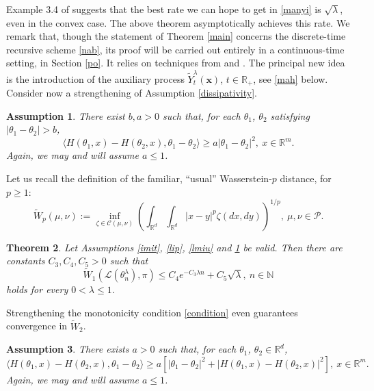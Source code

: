 \documentclass[a4paper,draft]{article}
\newtheorem{theorem}{Theorem}[section]
\newtheorem{assumption}[theorem]{Assumption}
\begin{document}
Example 3.4 of \cite{convex} suggests that the best rate we can hope to get in \eqref{manyi} is $\sqrt{\lambda}$, even in the convex case. The above theorem asymptotically achieves this rate.
We remark that, though
the statement of Theorem \ref{main} concerns the discrete-time recursive
scheme \eqref{nab}, its proof will
be carried out entirely in a continuous-time setting, in Section \ref{po}. It relies 
on techniques from \cite{convex} and \cite{eberle}. The principal new idea is
the introduction of the auxiliary process $\tilde{Y}^{\lambda}_t(\mathbf{x})$, $t\in\mathbb{R}_+$,
see \eqref{mah} below.
Consider now a strengthening of Assumption \ref{dissipativity}.

\begin{assumption}\label{coc}
There exist $b,a>0$ such that, for each $\theta_1$, $\theta_2$ satisfying 
$|\theta_1-\theta_2|>b$,
\begin{equation}\label{condition}
\langle H(\theta_1,x)-H(\theta_2,x),\theta_1-\theta_2\rangle\geq a |\theta_1-\theta_2|^2,\ x\in\mathbb{R}^m.
\end{equation}
Again, we may and will assume $a\leq 1$.
\end{assumption}

Let us recall the definition of the familiar, ``usual'' Wasserstein-$p$ distance, for $p\geq 1$:
\begin{equation}\label{family}
\tilde{W}_p(\mu,\nu):=\inf_{\zeta\in\mathcal{C}(\mu,\nu)}
\left(\int_{\mathbb{R}^d}\int_{\mathbb{R}^d}|x-y|^p\zeta(dx,dy)\right)^{1/p},\ \mu,\nu\in\mathcal{P}.
\end{equation}

\begin{theorem}\label{mainv} Let Assumptions \ref{imit}, \ref{lip}, \ref{lmiu} and \ref{coc}
be valid. Then there are constants
$C_3,C_4,C_5>0$ such that
\begin{equation}\label{menyi}
\tilde{W}_1(\mathcal{L}(\theta^{\lambda}_n),\pi)\leq C_4 e^{-C_3\lambda n} +C_5\sqrt{\lambda},\ n\in\mathbb{N}
\end{equation}
holds for every $0<\lambda\leq 1$.
\end{theorem}

Strengthening the monotonicity condition \eqref{condition} even guarantees convergence in $\tilde{W}_2$.

\begin{assumption}\label{coc1}
There exists $a>0$ such that, for each $\theta_1$, $\theta_2\in\mathbb{R}^d$, 
$$
\langle H(\theta_1,x)-H(\theta_2,x),\theta_1-\theta_2\rangle\geq a [|\theta_1-\theta_2|^2+|H(\theta_1,x)-
H(\theta_2,x)|^2],\ x\in\mathbb{R}^m.
$$
Again, we may and will assume $a\leq 1$.
\end{assumption}
\end{document}
